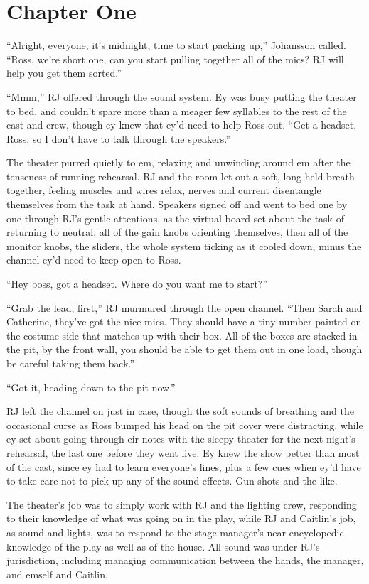 \chapter*{Chapter One}

``Alright, everyone, it's midnight, time to start packing up,'' Johansson called. ``Ross, we're short one, can you start pulling together all of the mics? RJ will help you get them sorted.''

``Mmm,'' RJ offered through the sound system. Ey was busy putting the theater to bed, and couldn't spare more than a meager few syllables to the rest of the cast and crew, though ey knew that ey'd need to help Ross out. ``Get a headset, Ross, so I don't have to talk through the speakers.''

The theater purred quietly to em, relaxing and unwinding around em after the tenseness of running rehearsal. RJ and the room let out a soft, long-held breath together, feeling muscles and wires relax, nerves and current disentangle themselves from the task at hand. Speakers signed off and went to bed one by one through RJ's gentle attentions, as the virtual board set about the task of returning to neutral, all of the gain knobs orienting themselves, then all of the monitor knobs, the sliders, the whole system ticking as it cooled down, minus the channel ey'd need to keep open to Ross.

``Hey boss, got a headset. Where do you want me to start?''

``Grab the lead, first,'' RJ murmured through the open channel. ``Then Sarah and Catherine, they've got the nice mics. They should have a tiny number painted on the costume side that matches up with their box. All of the boxes are stacked in the pit, by the front wall, you should be able to get them out in one load, though be careful taking them back.''

``Got it, heading down to the pit now.''

RJ left the channel on just in case, though the soft sounds of breathing and the occasional curse as Ross bumped his head on the pit cover were distracting, while ey set about going through eir notes with the sleepy theater for the next night's rehearsal, the last one before they went live. Ey knew the show better than most of the cast, since ey had to learn everyone's lines, plus a few cues when ey'd have to take care not to pick up any of the sound effects. Gun-shots and the like.

The theater's job was to simply work with RJ and the lighting crew, responding to their knowledge of what was going on in the play, while RJ and Caitlin's job, as sound and lights, was to respond to the stage manager's near encyclopedic knowledge of the play as well as of the house. All sound was under RJ's jurisdiction, including managing communication between the hands, the manager, and emself and Caitlin.

